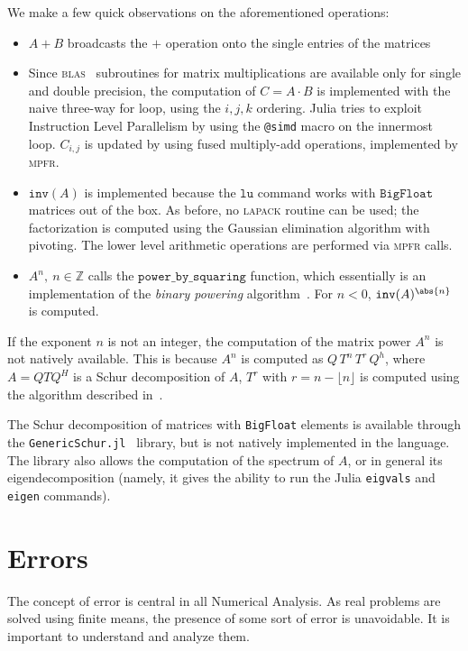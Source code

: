\begin{oss*}
	We make a few quick observations on the aforementioned operations:
	\begin{itemize}
		\item $A+B$ broadcasts the $+$ operation onto the single entries of the matrices 
		\item Since \textsc{blas}~\cite{article:BLAS} subroutines for matrix multiplications are available only for single and double precision, the computation of $C=A\cdot B$ is implemented with the naive three-way for loop, using the $i,j,k$ ordering. Julia tries to exploit Instruction Level Parallelism by using the \texttt{@simd} macro on the innermost loop. $C_{i,j}$ is updated by using fused multiply-add operations, implemented by \textsc{mpfr}.
		\item $\mathtt{inv}(A)$ is implemented because the $\mathtt{lu}$ command works with $\mathtt{BigFloat}$ matrices out of the box. As before, no \textsc{lapack} routine can be used; the factorization is computed using the Gaussian elimination algorithm with pivoting. The lower level arithmetic operations are performed via \textsc{mpfr} calls. 
		\item $A^n,\ n\in\mathbb{Z}$ calls the $\mathtt{power\_by\_squaring}$ function, which essentially is an implementation of the \emph{binary powering} algorithm~\cite[Alg.~4.1]{higham:matfun_book}. For $n<0$, $\mathtt{inv}(A)^{\abs{n}}$ is computed. 
	\end{itemize}
\end{oss*}
If the exponent $n$ is not an integer, the computation of the matrix power $A^n$ is not natively available. This is because $A^n$ is computed as $Q\,T^n\,T^r\,Q^{h}$, where $A=QTQ^H$ is a Schur decomposition of $A$, $T^r$ with $r=n-\lfloor n\rfloor$ is computed using the algorithm described in~\cite{higham:hili13}.

The Schur decomposition of matrices with \texttt{BigFloat} elements is available through the \texttt{GenericSchur.jl}~\cite{sw:GenericSchur} library, but is not natively implemented in the language.
The library also allows the computation of the spectrum of $A$, or in general its eigendecomposition (namely, it gives the ability to run the Julia \texttt{eigvals} and \texttt{eigen} commands). 

\section{Errors}
The concept of error is central in all Numerical Analysis. As real problems are solved using finite means, the presence of some sort of error is unavoidable. It is important to understand and analyze them.

